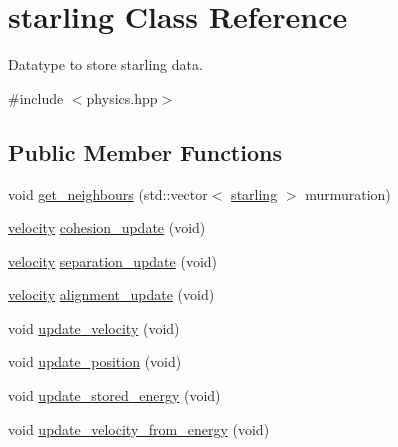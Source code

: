 \hypertarget{classstarling}{}\section{starling Class Reference}
\label{classstarling}


Datatype to store starling data.  




{\ttfamily \#include $<$physics.\+hpp$>$}

\subsection*{Public Member Functions}
\begin{DoxyCompactItemize}
\item 
void \mbox{\hyperlink{classstarling_aa0e07efe70a471582f609524db1ac8af}{get\+\_\+neighbours}} (std\+::vector$<$ \mbox{\hyperlink{classstarling}{starling}} $>$ murmuration)
\item 
\mbox{\hyperlink{classvelocity}{velocity}} \mbox{\hyperlink{classstarling_a9979a7817ef2663a2cf87de308d1f223}{cohesion\+\_\+update}} (void)
\item 
\mbox{\hyperlink{classvelocity}{velocity}} \mbox{\hyperlink{classstarling_add23addc4c4ef3e24765f5200b08adca}{separation\+\_\+update}} (void)
\item 
\mbox{\hyperlink{classvelocity}{velocity}} \mbox{\hyperlink{classstarling_aff2aa7c8238900186857ced2789d589c}{alignment\+\_\+update}} (void)
\item 
void \mbox{\hyperlink{classstarling_ad20f4d47e4042a39771385bee79c07dc}{update\+\_\+velocity}} (void)
\item 
void \mbox{\hyperlink{classstarling_a5fa9e4fa8154e1b81adb29573954ec15}{update\+\_\+position}} (void)
\item 
void \mbox{\hyperlink{classstarling_a1d8f70aad997f935444426243d3ed20a}{update\+\_\+stored\+\_\+energy}} (void)
\item 
void \mbox{\hyperlink{classstarling_a20bc1b29e16a9e3d1e07bd756a3f2dae}{update\+\_\+velocity\+\_\+from\+\_\+energy}} (void)
\end{DoxyCompactItemize}
